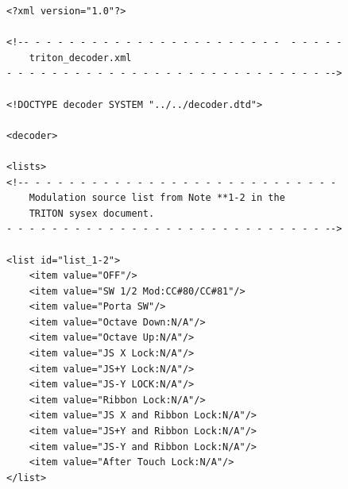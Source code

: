 \documentclass[a4paper,twoside,12pt]{article}
\begin{document}
\begin{verbatim}
<?xml version="1.0"?>

<!-- - - - - - - - - - - - - - - - - - - - - - -  - - - - -
    triton_decoder.xml
- - - - - - - - - - - - - - - - - - - - - - - - - - - - -->

<!DOCTYPE decoder SYSTEM "../../decoder.dtd">

<decoder>

<lists>
<!-- - - - - - - - - - - - - - - - - - - - - - - - - - - -
    Modulation source list from Note **1-2 in the
    TRITON sysex document.
- - - - - - - - - - - - - - - - - - - - - - - - - - - - -->

<list id="list_1-2">
    <item value="OFF"/>
    <item value="SW 1/2 Mod:CC#80/CC#81"/>
    <item value="Porta SW"/>
    <item value="Octave Down:N/A"/>
    <item value="Octave Up:N/A"/>
    <item value="JS X Lock:N/A"/>
    <item value="JS+Y Lock:N/A"/>
    <item value="JS-Y LOCK:N/A"/>
    <item value="Ribbon Lock:N/A"/>
    <item value="JS X and Ribbon Lock:N/A"/>
    <item value="JS+Y and Ribbon Lock:N/A"/>
    <item value="JS-Y and Ribbon Lock:N/A"/>
    <item value="After Touch Lock:N/A"/>
</list>


\end{verbatim}
\end{document}
